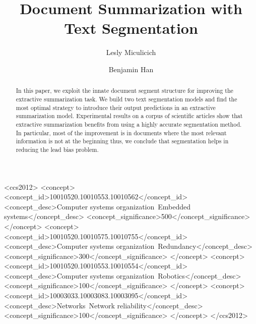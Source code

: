 \documentclass[sigconf]{acmart}
\begin{document}
\title{Document Summarization with Text Segmentation}

\author{Lesly Miculicich}
\author{Benjamin Han}
\authornotemark[1]



\begin{abstract}
In this paper, we exploit the innate document segment structure for improving the extractive summarization task. We build two text segmentation models and find the most optimal strategy to introduce their output predictions in an extractive summarization model. Experimental results on a corpus of scientific articles show that extractive summarization benefits from using a highly accurate segmentation method. In particular, most of the improvement is in documents where the most relevant information is not at the beginning thus, we conclude that segmentation helps in reducing the lead bias problem.

\end{abstract}

\begin{CCSXML}
<ccs2012>
 <concept>
  <concept_id>10010520.10010553.10010562</concept_id>
  <concept_desc>Computer systems organization~Embedded systems</concept_desc>
  <concept_significance>500</concept_significance>
 </concept>
 <concept>
  <concept_id>10010520.10010575.10010755</concept_id>
  <concept_desc>Computer systems organization~Redundancy</concept_desc>
  <concept_significance>300</concept_significance>
 </concept>
 <concept>
  <concept_id>10010520.10010553.10010554</concept_id>
  <concept_desc>Computer systems organization~Robotics</concept_desc>
  <concept_significance>100</concept_significance>
 </concept>
 <concept>
  <concept_id>10003033.10003083.10003095</concept_id>
  <concept_desc>Networks~Network reliability</concept_desc>
  <concept_significance>100</concept_significance>
 </concept>
</ccs2012>
\end{CCSXML}


\end{document}
